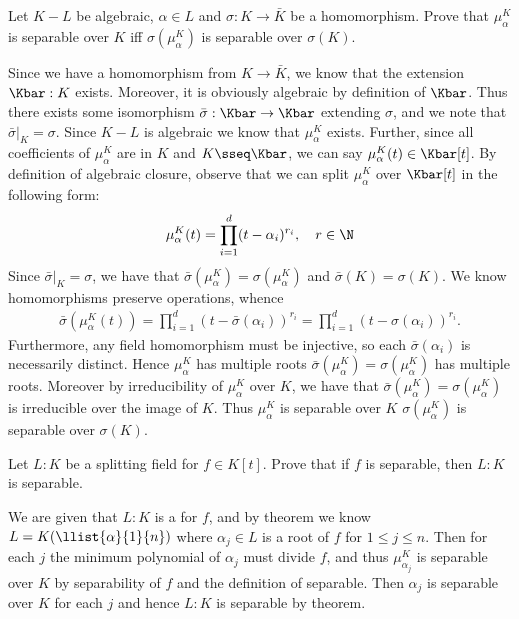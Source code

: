\documentclass{article}
\begin{document}
\begin{subexercise}
  Let \( K-L \) be algebraic, \( \alpha\in L \) and \( \sigma:K\to \bar K \) be a homomorphism.
  Prove that \( \mu_\alpha^K \) is separable over \( K \) iff \( \sigma(\mu_\alpha^K) \) is separable over \( \sigma(K) \).
\end{subexercise}
\begin{solution}
  Since we have a homomorphism from \( K\to \bar K \), we know that the extension \( \Kbar:K \) exists.
  Moreover, it is obviously algebraic by definition of \( \Kbar \).
  Thus there exists some isomorphism \( \bar\sigma:\Kbar\to\Kbar \) extending \( \sigma \), and we note that \( \bar\sigma|_{K} = \sigma \).
  Since \( K-L \) is algebraic we know that \( \mu_\alpha^K \) exists.
  Further, since all coefficients of \( \mu_\alpha^K \) are in \( K \) and \( K \sseq \Kbar \), we can say \( \mu_\alpha^K(t)\in \Kbar[t] \).
  By definition of algebraic closure, observe that we can split \( \mu_\alpha^K \) over \( \Kbar[t] \) in the following form: \begin{align*}
    \mu_\alpha^K(t) = \prod_{i=1}^{d}(t-\alpha_i)^{r_i},\quad r\in \N
  \end{align*}
  Since \( \bar\sigma|_{K} = \sigma \), we have that \( \bar\sigma(\mu_\alpha^K) = \sigma(\mu_\alpha^K) \) and \( \bar\sigma(K) = \sigma(K) \).
  We know homomorphisms preserve operations, whence
  \begin{align*}
    \bar\sigma\left(\mu_\alpha^K(t)\right) = \prod_{i=1}^{d}(t-\bar\sigma(\alpha_i))^{r_i} = \prod_{i=1}^{d}(t-\sigma(\alpha_i))^{r_i}.
  \end{align*}
  Furthermore, any field homomorphism must be injective, so each \( \bar\sigma(\alpha_i) \) is necessarily distinct.
  Hence \( \mu_\alpha^K \) has multiple roots \iff \( \bar\sigma(\mu_\alpha^K)=\sigma(\mu_\alpha^K) \) has multiple roots.
  Moreover by irreducibility of \( \mu_\alpha^K \) over \( K \), we have that \( \bar\sigma(\mu_\alpha^K) = \sigma(\mu_\alpha^K) \) is irreducible over the image of \( K \).
  Thus \( \mu_\alpha^K \) is separable over \( K \) \iff \( \sigma(\mu_\alpha^K) \) is separable over \( \sigma(K) \).
\end{solution}

\begin{subexercise} \label{ex:sfe1}
  Let \( L:K \) be a splitting field for \( f\in K[t] \).
  Prove that if \( f \) is separable, then \( L:K \) is separable.
\end{subexercise}
\begin{solution}
  We are given that \( L:K \) is a \sfe for \( f \), and by theorem we know \( L=K(\llist{\alpha}{1}{n}) \) where \( \alpha_j\in L \) is a root of \( f \) for \( 1\leq j\leq n \).
  Then for each \( j \) the minimum polynomial of \( \alpha_j \) must divide \( f \), and thus \( \mu_{\alpha_j}^K \) is separable over \( K \) by separability of \( f \) and the definition of separable.
  Then \( \alpha_j \) is separable over \( K \) for each \( j \) and hence \( L:K \) is separable by theorem.
\end{solution}
\end{document}
